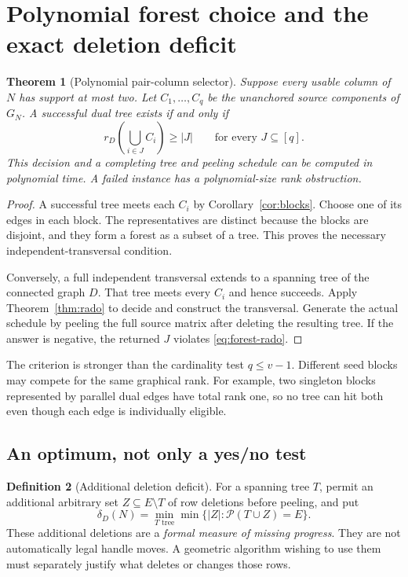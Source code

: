 \documentclass[11pt,letterpaper]{article}
\newtheorem{theorem}{Theorem}[section]
\theoremstyle{definition}
\newtheorem{definition}[theorem]{Definition}
\theoremstyle{remark}
\begin{document}
\section{Polynomial forest choice and the exact deletion deficit}\label{sec:deficit}
\begin{theorem}[Polynomial pair-column selector]\label{thm:pair-selector}
Suppose every usable column of $N$ has support at most two. Let $C_1,\ldots,C_q$
be the unanchored source components of $G_N$. A successful dual tree exists if
and only if
\begin{equation}\label{eq:forest-rado}
 r_D\!\left(\bigcup_{i\in J} C_i\right)\ge |J|
 \qquad\text{for every }J\subseteq[q].
\end{equation}
This decision and a completing tree and peeling schedule can be computed in
polynomial time. A failed instance has a polynomial-size rank obstruction.
\end{theorem}
\begin{proof}
A successful tree meets each $C_i$ by Corollary~\ref{cor:blocks}. Choose one of
its edges in each block. The representatives are distinct because the blocks
are disjoint, and they form a forest as a subset of a tree. This proves the
necessary independent-transversal condition.

Conversely, a full independent transversal extends to a spanning tree of the
connected graph $D$. That tree meets every $C_i$ and hence succeeds. Apply
Theorem~\ref{thm:rado} to decide and construct the transversal. Generate the
actual schedule by peeling the full source matrix after deleting the resulting
tree. If the answer is negative, the returned $J$ violates
\eqref{eq:forest-rado}.
\end{proof}

The criterion is stronger than the cardinality test $q\le v-1$. Different seed
blocks may compete for the same graphical rank. For example, two singleton
blocks represented by parallel dual edges have total rank one, so no tree can
hit both even though each edge is individually eligible.

\subsection{An optimum, not only a yes/no test}
\begin{definition}[Additional deletion deficit]
For a spanning tree $T$, permit an additional arbitrary set $Z\subseteq E\setminus T$
of row deletions before peeling, and put
\[
 \delta_D(N)=\min_{T\text{ tree}}\min\{|Z|:\mathcal P(T\cup Z)=E\}.
\]
These additional deletions are a \emph{formal measure of missing progress}. They
are not automatically legal handle moves. A geometric algorithm wishing to use
them must separately justify what deletes or changes those rows.
\end{definition}
\end{document}
